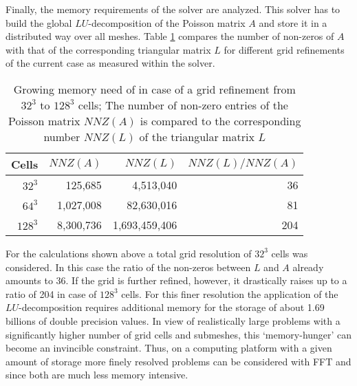 Finally, the memory requirements of the \uglmat{} solver are analyzed.
This solver has to build the global $LU$-decomposition of the Poisson matrix $A$ and store it in a distributed way over all meshes.
Table \ref{TAB_scarc_duct_flow_memory_needs} compares the number of non-zeros of $A$ with that of the corresponding triangular matrix $L$ for different grid refinements of the current case as measured within the solver.

\begin{table}[h]
\begin{center}
{
\begin{tabular}{|r|r|r|r|}
\hline
Cells         &   $NNZ(A)$     &        $NNZ(L)$ &  $NNZ(L)/NNZ(A)$   \\  \hline
  $32^3$   &      125,685      &        4,513,040 &  36    \hspace{0.4in}                       \\
  $64^3$   &   1,027,008      &      82,630,016 &  81    \hspace{0.4in}                        \\
  $128^3$ &   8,300,736      & 1,693,459,406 &  204   \hspace{0.4in}                        \\  \hline
\end{tabular}
}
\caption[Growing memory need of \uglmat{} in case of a grid refinement]{Growing memory need of \uglmat{} in case of a grid refinement from $32^3$ to $128^3$ cells; The number of non-zero entries of the Poisson matrix $NNZ(A)$ is compared to the corresponding number $NNZ(L)$ of the triangular matrix $L$}
\label{TAB_scarc_duct_flow_memory_needs}
\end{center}
\end{table}


For the calculations shown above a total grid resolution of $32^3$ cells was considered. In this case
the ratio of the non-zeros between $L$ and $A$ already amounts to 36. 
If the grid is further refined, however, it drastically raises up to a ratio of 204 in case of $128^3$ cells. For this finer resolution
the application of the $LU$-decomposition requires additional memory for the storage of
about 1.69 billions of double precision values. 
In view of realistically large problems with a significantly higher number of grid cells and submeshes, this `memory-hunger' can become an invincible constraint. Thus, on a computing platform with a given amount of storage more finely resolved problems can be considered with FFT and \scarc{} since both are much less memory intensive.

